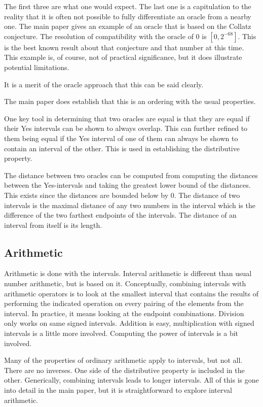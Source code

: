 \documentclass[12pt]{article}
\theoremstyle{remark}
\begin{document}
The first three are what one would expect. The last one is a capitulation to the reality that it is often not possible to fully differentiate an oracle from a nearby one. The main paper gives an example of an oracle that is based on the Collatz conjecture. The resolution of compatibility with the oracle of 0 
 is $[0,2^{-68}]$. This is the best known result about that conjecture and that number at this time. This example is, of course, not of practical significance, but it does illustrate potential limitations. 

 It is a merit of the oracle approach that this can be said clearly. 

The main paper does establish that this is an ordering with the usual properties. 

One key tool in determining that two oracles are equal is that they are equal if their Yes intervals can be shown to always overlap. This can further refined to them being equal if the Yes interval of one of them can always be shown to contain an interval of the other. This is used in establishing the distributive property. 

The distance between two oracles can be computed from computing the distances between the Yes-intervals and taking the greatest lower bound of the distances. This exists since the distances are bounded below by 0. The distance of two intervals is the maximal distance of any two numbers in the interval which is the difference of the two farthest endpoints of the intervals. The distance of an interval from itself is its length. 

\subsection{Arithmetic}

Arithmetic is done with the intervals. Interval arithmetic is different than usual number arithmetic, but is based on it. Conceptually, combining intervals with arithmetic operators is to look at the smallest interval that contains the results of performing the indicated operation on every pairing of the elements from the interval. In practice, it means looking at the endpoint combinations. Division only works on same signed intervals. Addition is easy, multiplication with signed intervals is a little more involved. Computing the power of intervals is a bit involved. 


Many of the properties of ordinary arithmetic apply to intervals, but not all. There are no inverses. One side of the distributive property is included in the other. Generically, combining intervals leads to longer intervals. All of this is gone into detail in the main paper, but it is straightforward to explore interval arithmetic. 
\end{document}
